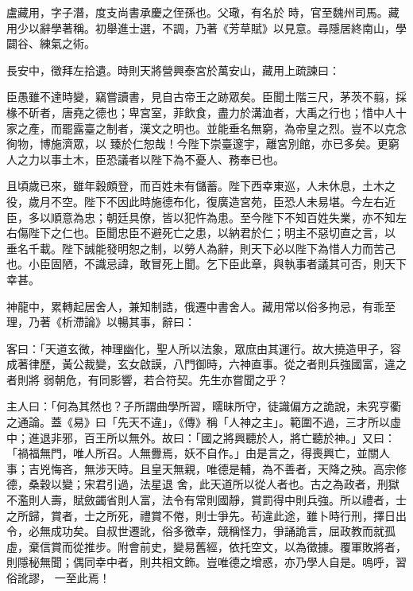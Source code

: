\begin{pinyinscope}
 盧藏用，字子潛，度支尚書承慶之侄孫也。父璥，有名於
 時，官至魏州司馬。藏用少以辭學著稱。初舉進士選，不調，乃著《芳草賦》以見意。尋隱居終南山，學闢谷、練氣之術。



 長安中，徵拜左拾遺。時則天將營興泰宮於萬安山，藏用上疏諫曰：



 臣愚雖不達時變，竊嘗讀書，見自古帝王之跡眾矣。臣聞土階三尺，茅茨不翦，採椽不斫者，唐堯之德也；卑宮室，菲飲食，盡力於溝洫者，大禹之行也；惜中人十家之產，而罷露臺之制者，漢文之明也。並能垂名無窮，為帝皇之烈。豈不以克念徇物，博施濟眾，以
 臻於仁恕哉！今陛下崇臺邃宇，離宮別館，亦已多矣。更窮人之力以事土木，臣恐議者以陛下為不憂人、務奉已也。



 且頃歲已來，雖年穀頗登，而百姓未有儲蓄。陛下西幸東巡，人未休息，土木之役，歲月不空。陛下不因此時施德布化，復廣造宮苑，臣恐人未易堪。今左右近臣，多以順意為忠；朝廷具僚，皆以犯忤為患。至今陛下不知百姓失業，亦不知左右傷陛下之仁也。臣聞忠臣不避死亡之患，以納君於仁；明主不惡切直之言，以
 垂名千載。陛下誠能發明恕之制，以勞人為辭，則天下必以陛下為惜人力而苦己也。小臣固陋，不識忌諱，敢冒死上聞。乞下臣此章，與執事者議其可否，則天下幸甚。



 神龍中，累轉起居舍人，兼知制誥，俄遷中書舍人。藏用常以俗多拘忌，有乖至理，乃著《析滯論》以暢其事，辭曰：



 客曰：「天道玄微，神理幽化，聖人所以法象，眾庶由其運行。故大撓造甲子，容成著律歷，黃公裁變，玄女啟謨，八門御時，六神直事。從之者則兵強國富，違之者則將
 弱朝危，有同影響，若合符契。先生亦嘗聞之乎？



 主人曰：「何為其然也？子所謂曲學所習，曘昧所守，徒識偏方之詭說，未究亨衢之通論。蓋《易》曰「先天不違」，《傳》稱「人神之主」。範圍不過，三才所以虛中；進退非邪，百王所以無外。故曰：「國之將興聽於人，將亡聽於神。」又曰：「禍福無門，唯人所召。人無釁焉，妖不自作。」由是言之，得喪興亡，並關人事；吉兇悔吝，無涉天時。且皇天無親，唯德是輔，為不善者，天降之殃。高宗修德，桑穀以變；宋君引過，法星退
 舍，此天道所以從人者也。古之為政者，刑獄不濫則人壽，賦斂蠲省則人富，法令有常則國靜，賞罰得中則兵強。所以禮者，士之所歸，賞者，士之所死，禮賞不倦，則士爭先。茍違此途，雖卜時行刑，擇日出令，必無成功矣。自叔世遷訛，俗多徼幸，競稱怪力，爭誦詭言，屈政教而就孤虛，棄信賞而從推步。附會前史，變易舊經，依托空文，以為徵據。覆軍敗將者，則隱秘無聞；偶同幸中者，則共相文飾。豈唯德之增惑，亦乃學人自是。嗚呼，習俗訛謬，
 一至此焉！




\end{pinyinscope}
